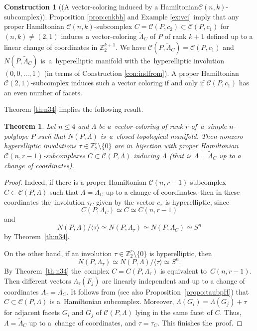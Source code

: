\documentclass[12pt]{amsart}
\newtheorem{theorem}[formula]{Theorem}
\theoremstyle{definition}
\newtheorem{construction}[formula]{Construction}
\theoremstyle{remark}
\begin{document}
\begin{construction}[(A vector-coloring induced by a Hamiltonian\linebreak  $\mathcal{C}(n,k)$-subcomplex)]\label{con:LHC}
Proposition \ref{prop:cnkbh} and Example \ref{ex:vci} imply that any proper Hamiltonian  $\mathcal{C}(n,k)$-subcomplex
$C=\mathcal{C}(P,c_2)\subset \mathcal{C}(P,c_1)$ for $(n,k)\ne (2,1)$ induces a vector-coloring $\widetilde{\Lambda}_C$ of $P$ of rank $k+1$
defined up to a linear change of coordinates in $\mathbb Z_2^{k+1}$. We have 
$\mathcal{C}(P,\widetilde{\Lambda}_C)=\mathcal{C}(P,c_1)$ and $N(P,\widetilde{\Lambda}_C)$ is~a~hyperelliptic manifold 
with the~hyperelliptic involution $(0,0,\dots,1)$ (in terms of Construction \ref{con:indfrom}).  
A proper Hamiltonian  $\mathcal{C}(2,1)$-subcomplex 
induces such a vector coloring if and only if  $\mathcal{C}(P,c_1)$ has an even number of facets.
\end{construction}

Theorem \ref{th:n34} implies the following result.
\begin{theorem}\label{th:Hamsc}
Let $n\leqslant 4$ and  $\Lambda$ be a~vector-coloring of rank $r$ of~a~simple $n$-polytope $P$ such that 
$N(P,\Lambda)$ is~a~closed topological manifold. Then nonzero hyperelliptic involutions 
$\tau\in \mathbb Z_2^r\setminus\{0\}$ %
are in~bijection with proper Hamiltonian $\mathcal{C}(n,r-1)$-subcomplexes $C\subset\mathcal{C}(P,\Lambda)$
inducing $\Lambda$ (that is $\Lambda=\widetilde{\Lambda}_C$ up to a change of coordinates).
\end{theorem}
\begin{proof}
Indeed, if there is a proper Hamiltonian $\mathcal{C}(n,r-1)$-subcomplex $C\subset\mathcal{C}(P,\Lambda)$ 
such that $\Lambda=\widetilde{\Lambda}_C$ up to a change of coordinates, then in these coordinates 
the~involution $\tau_C$ given by the vector $e_r$ is hyperelliptic, since 
$$
C(P,\Lambda_C)\simeq C\simeq C(n,r-1)
$$ 
and 
$$
N(P,\Lambda)/\langle\tau\rangle\simeq N(P,\Lambda_\tau)\simeq N(P,\Lambda_C)\simeq S^n
$$ 
by Theorem~\ref{th:n34}.

On the other hand, if an involution $\tau\in \mathbb Z_2^r\setminus\{0\}$ is hyperelliptic, then 
$$
N(P,\Lambda_\tau)\simeq N(P,\Lambda)/\langle\tau\rangle\simeq S^n.
$$
By Theorem~\ref{th:n34} the~complex $C=C(P,\Lambda_\tau)$ is equivalent to~$C(n,r-1)$. Then 
different vectors  $\Lambda_\tau(F_j)$ are linearly independent and up to a change of coordinates 
$\Lambda_\tau=\Lambda_C$. It follows from \cite[Proposition 5.12]{E24} (see also Proposition~\ref{propo:taubpH}) that
$C\subset\mathcal{C}(P,\Lambda)$ is a~Hamiltonian subcomplex. Moreover,  $\Lambda(G_i)=\Lambda(G_j)+\tau$ 
for adjacent facets $G_i$ and $G_j$ of $\mathcal{C}(P,\Lambda)$ lying in the same facet of $C$. Thus, 
$\Lambda=\widetilde{\Lambda}_C$ up to a~change of coordinates, and  $\tau=\tau_C$. This finishes the~proof.
\end{proof}
\end{document}
